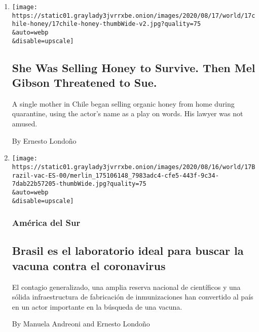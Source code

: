 \begin{enumerate}
\def\labelenumi{\arabic{enumi}.}
\item
  \href{/2020/08/17/world/americas/honey-mel-gibson-chile.html}{}

  \texttt{[image: https://static01.graylady3jvrrxbe.onion/images/2020/08/17/world/17chile-honey/17chile-honey-thumbWide-v2.jpg?quality=75\\\&auto=webp\\\&disable=upscale]}

  \hypertarget{she-was-selling-honey-to-survive-then-mel-gibson-threatened-to-sue}{%
  \subsection{She Was Selling Honey to Survive. Then Mel Gibson
  Threatened to
  Sue.}\label{she-was-selling-honey-to-survive-then-mel-gibson-threatened-to-sue}}

  A single mother in Chile began selling organic honey from home during
  quarantine, using the actor's name as a play on words. His lawyer was
  not amused.

  By Ernesto Londoño
\item
  \href{/es/2020/08/17/espanol/america-latina/vacuna-coronavirus-brasil.html}{}

  \texttt{[image: https://static01.graylady3jvrrxbe.onion/images/2020/08/16/world/17Brazil-vac-ES-00/merlin\_175106148\_7983adc4-cfe5-443f-9c34-7dab22b57205-thumbWide.jpg?quality=75\\\&auto=webp\\\&disable=upscale]}

  \hypertarget{amuxe9rica-del-sur}{%
  \subsubsection{América del Sur}\label{amuxe9rica-del-sur}}

  \hypertarget{brasil-es-el-laboratorio-ideal-para-buscar-la-vacuna-contra-el-coronavirus}{%
  \subsection{Brasil es el laboratorio ideal para buscar la vacuna
  contra el
  coronavirus}\label{brasil-es-el-laboratorio-ideal-para-buscar-la-vacuna-contra-el-coronavirus}}

  El contagio generalizado, una amplia reserva nacional de científicos y
  una sólida infraestructura de fabricación de inmunizaciones han
  convertido al país en un actor importante en la búsqueda de una
  vacuna.

  By Manuela Andreoni and Ernesto Londoño


\end{enumerate}
